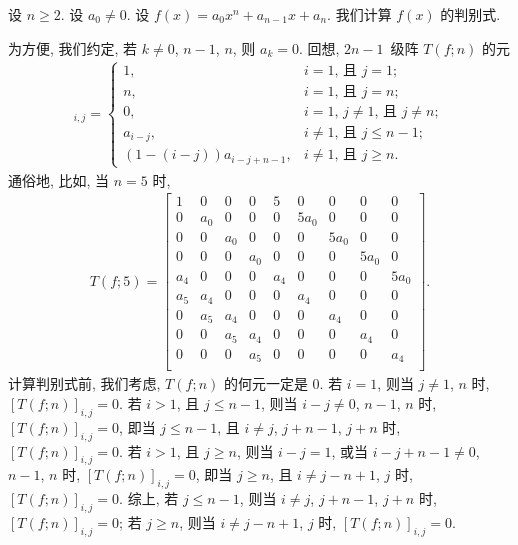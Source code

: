 \documentclass[../libro.tex]{subfiles}
\begin{document}
\begin{example}
    设 \(n \geq 2\).
    设 \(a_0 \neq 0\).
    设 \(f(x) = a_0 x^n + a_{n-1} x + a_n\).
    我们计算 \(f(x)\) 的判别式.

    为方便, 我们约定,
    若 \(k \neq 0\), \(n-1\), \(n\),
    则 \(a_k = 0\).
    回想, \(2n-1\)~级阵 \(T(f; n)\) 的元
    \begin{align*}
        [T(f; n)]_{i,j} =
        \begin{cases}
            1,
            & \text{\(i = 1\), 且 \(j = 1\)}; \\
            n,
            & \text{\(i = 1\), 且 \(j = n\)}; \\
            0,
            & \text{\(i = 1\), \(j \neq 1\), 且 \(j \neq n\)}; \\
            a_{i-j},
            & \text{\(i \neq 1\), 且 \(j \leq n-1\)}; \\
            (1 - (i - j)) a_{i-j+n-1},
            & \text{\(i \neq 1\), 且 \(j \geq n\)}.
        \end{cases}
    \end{align*}
    通俗地, 比如, 当 \(n = 5\) 时,
    \begin{align*}
        T(f; 5) =
        \begin{bmatrix}
            1   & 0   & 0   & 0   & 5   & 0     & 0     & 0     & 0     \\
            0   & a_0 & 0   & 0   & 0   & 5 a_0 & 0     & 0     & 0     \\
            0   & 0   & a_0 & 0   & 0   & 0     & 5 a_0 & 0     & 0     \\
            0   & 0   & 0   & a_0 & 0   & 0     & 0     & 5 a_0 & 0     \\
            a_4 & 0   & 0   & 0   & a_4 & 0     & 0     & 0     & 5 a_0 \\
            a_5 & a_4 & 0   & 0   & 0   & a_4   & 0     & 0     & 0     \\
            0   & a_5 & a_4 & 0   & 0   & 0     & a_4   & 0     & 0     \\
            0   & 0   & a_5 & a_4 & 0   & 0     & 0     & a_4   & 0     \\
            0   & 0   & 0   & a_5 & 0   & 0     & 0     & 0     & a_4   \\
        \end{bmatrix}.
    \end{align*}
    计算判别式前, 我们考虑, \(T(f; n)\) 的何元一定是 \(0\).
    若 \(i = 1\), 则当 \(j \neq 1\), \(n\) 时,
    \([T(f; n)]_{i,j} = 0\).
    若 \(i > 1\), 且 \(j \leq n - 1\),
    则当 \(i - j \neq 0\), \(n-1\), \(n\) 时,
    \([T(f; n)]_{i,j} = 0\),
    即当 \(j \leq n - 1\),
    且 \(i \neq j\), \(j + n - 1\), \(j + n\) 时,
    \([T(f; n)]_{i,j} = 0\).
    若 \(i > 1\), 且 \(j \geq n\),
    则当 \(i - j = 1\),
    或当 \(i - j + n - 1 \neq 0\), \(n-1\), \(n\) 时,
    \([T(f; n)]_{i,j} = 0\),
    即当 \(j \geq n\),
    且 \(i \neq j - n + 1\), \(j\) 时,
    \([T(f; n)]_{i,j} = 0\).
    综上,
    若 \(j \leq n-1\),
    则当 \(i \neq j\), \(j+n-1\), \(j+n\) 时,
    \([T(f; n)]_{i,j} = 0\);
    若 \(j \geq n\),
    则当 \(i \neq j-n+1\), \(j\) 时,
    \([T(f; n)]_{i,j} = 0\).


\end{example}
\end{document}
